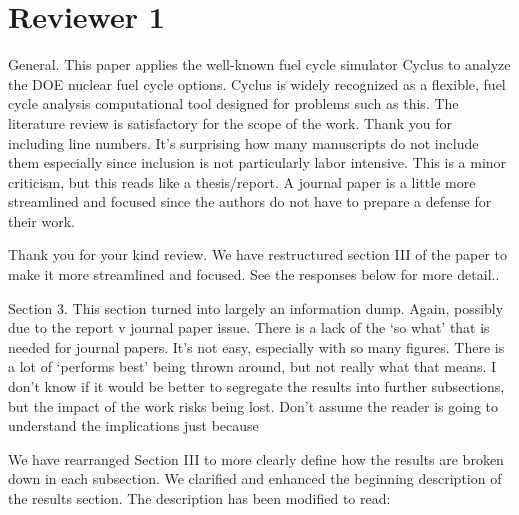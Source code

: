 \documentclass[answers,11pt]{exam}
\begin{document}
\section*{Reviewer 1}
\begin{questions}

\question General. This paper applies the well-known fuel cycle simulator Cyclus to analyze the DOE nuclear
fuel cycle options. Cyclus is widely recognized as a flexible, fuel cycle analysis computational tool designed for problems such as this. The literature review is satisfactory for the scope of the work. Thank
you for including line numbers. It’s surprising how many manuscripts do not include them especially
since inclusion is not particularly labor intensive. This is a minor criticism, but this reads like a thesis/report. A journal paper is a little more streamlined and focused since the authors do not have to
prepare a defense for their work.

\begin{solution}
        Thank you for your kind review.
        We have restructured section III of the paper to make it more streamlined and focused. 
        See the responses below for more detail..
\end{solution}

\question Section 3. This section turned into largely an information dump. Again, possibly due to the report v
journal paper issue. There is a lack of the ‘so what’ that is needed for journal papers. It’s not easy,
especially with so many figures. There is a lot of ‘performs best’ being thrown around, but not really
what that means. I don’t know if it would be better to segregate the results into further subsections, but
the impact of the work risks being lost. Don’t assume the reader is going to understand the implications
just because

\begin{solution}
We have rearranged Section III to more clearly define how the results are broken down in each subsection. 
We clarified and enhanced the beginning description of the results section. The description has been 
modified to read: 


\end{solution}
\end{questions}
\end{document}
